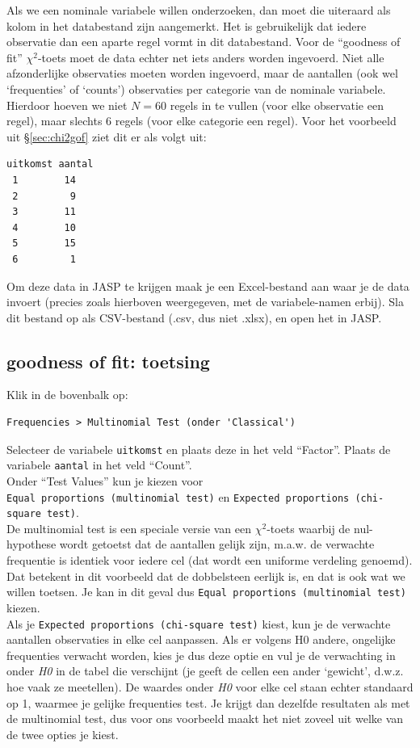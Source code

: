 \documentclass[
]{book}
\begin{document}
Als we een nominale variabele willen onderzoeken, dan moet die uiteraard
als kolom in het databestand zijn aangemerkt. Het is gebruikelijk dat iedere observatie dan een aparte regel vormt in dit databestand. Voor de ``goodness of fit'' \(\chi^2\)-toets moet de data echter net iets anders worden ingevoerd. Niet alle afzonderlijke observaties moeten worden ingevoerd, maar de aantallen (ook wel `frequenties' of `counts') observaties per categorie van de nominale variabele. Hierdoor hoeven we niet \(N=60\) regels in te vullen (voor elke observatie een regel), maar slechts 6 regels (voor elke categorie een regel). Voor het voorbeeld uit §\ref{sec:chi2gof} ziet dit er als volgt uit:

\begin{verbatim}
uitkomst aantal
 1        14
 2         9
 3        11
 4        10
 5        15
 6         1
\end{verbatim}

Om deze data in JASP te krijgen maak je een Excel-bestand aan waar je de data invoert (precies zoals hierboven weergegeven, met de variabele-namen erbij).
Sla dit bestand op als CSV-bestand (.csv, dus niet .xlsx), en open het in JASP.

\hypertarget{goodness-of-fit-toetsing-1}{%
\subsection{goodness of fit: toetsing}\label{goodness-of-fit-toetsing-1}}

Klik in de bovenbalk op:

\begin{verbatim}
Frequencies > Multinomial Test (onder 'Classical')
\end{verbatim}

Selecteer de variabele \texttt{uitkomst} en plaats deze in het veld ``Factor''. Plaats de variabele \texttt{aantal} in het veld ``Count''.\\

Onder ``Test Values'' kun je kiezen voor \texttt{Equal\ proportions\ (multinomial\ test)} en \texttt{Expected\ proportions\ (chi-square\ test)}.\\
De multinomial test is een speciale versie van een \(\chi^2\)-toets waarbij de nul-hypothese wordt getoetst dat de aantallen gelijk zijn, m.a.w. de verwachte frequentie is identiek voor iedere cel (dat wordt een uniforme verdeling genoemd). Dat betekent in dit voorbeeld dat de dobbelsteen eerlijk is, en dat is ook wat we willen toetsen. Je kan in dit geval dus \texttt{Equal\ proportions\ (multinomial\ test)} kiezen.\\
Als je \texttt{Expected\ proportions\ (chi-square\ test)} kiest, kun je de verwachte aantallen observaties in elke cel aanpassen. Als er volgens H0 andere, ongelijke frequenties verwacht worden, kies je dus deze optie en vul je de verwachting in onder \emph{H0} in de tabel die verschijnt (je geeft de cellen een ander `gewicht', d.w.z. hoe vaak ze meetellen). De waardes onder \emph{H0} voor elke cel staan echter standaard op 1, waarmee je gelijke frequenties test. Je krijgt dan dezelfde resultaten als met de multinomial test, dus voor ons voorbeeld maakt het niet zoveel uit welke van de twee opties je kiest.
\end{document}
